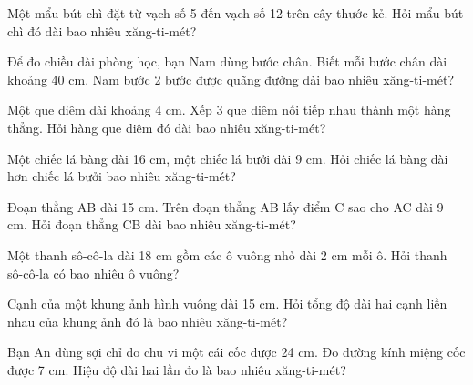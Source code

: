 \begin{ex}
Một mẩu bút chì đặt từ vạch số 5 đến vạch số 12 trên cây thước kẻ. Hỏi mẩu bút chì đó dài bao nhiêu xăng-ti-mét?
\end{ex}

\begin{ex}
Để đo chiều dài phòng học, bạn Nam dùng bước chân. Biết mỗi bước chân dài khoảng 40 cm. Nam bước 2 bước được quãng đường dài bao nhiêu xăng-ti-mét?
\end{ex}

\begin{ex}
Một que diêm dài khoảng 4 cm. Xếp 3 que diêm nối tiếp nhau thành một hàng thẳng. Hỏi hàng que diêm đó dài bao nhiêu xăng-ti-mét?
\end{ex}

\begin{ex}
Một chiếc lá bàng dài 16 cm, một chiếc lá bưởi dài 9 cm. Hỏi chiếc lá bàng dài hơn chiếc lá bưởi bao nhiêu xăng-ti-mét?
\end{ex}

\begin{ex}
Đoạn thẳng AB dài 15 cm. Trên đoạn thẳng AB lấy điểm C sao cho AC dài 9 cm. Hỏi đoạn thẳng CB dài bao nhiêu xăng-ti-mét?
\end{ex}

\begin{ex}
Một thanh sô-cô-la dài 18 cm gồm các ô vuông nhỏ dài 2 cm mỗi ô. Hỏi thanh sô-cô-la có bao nhiêu ô vuông?
\end{ex}

\begin{ex}
Cạnh của một khung ảnh hình vuông dài 15 cm. Hỏi tổng độ dài hai cạnh liền nhau của khung ảnh đó là bao nhiêu xăng-ti-mét?
\end{ex}

\begin{ex}
Bạn An dùng sợi chỉ đo chu vi một cái cốc được 24 cm. Đo đường kính miệng cốc được 7 cm. Hiệu độ dài hai lần đo là bao nhiêu xăng-ti-mét?
\end{ex}

